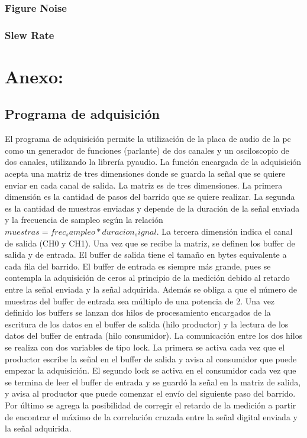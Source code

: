 \documentclass[a4paper, 11pt]{article}
\begin{document}
\subsubsection*{Figure Noise}

\subsubsection*{Slew Rate}

\section*{Anexo:}
\subsection*{Programa de adquisición}
El programa de adquisición permite la utilización de la placa de audio de la pc como un generador de funciones (parlante) de dos canales y un osciloscopio de dos canales, utilizando la librería pyaudio. La función encargada de la adquisición acepta una matriz de tres dimensiones donde se guarda la señal que se quiere enviar en cada canal de salida. La matriz es de tres dimensiones. La primera dimensión es la cantidad de pasos del barrido que se quiere realizar. La segunda es la cantidad de muestras enviadas y depende de la duración de la señal enviada y la frecuencia de sampleo según la relación $muestras=frec_sampleo*duracion_signal$. La tercera dimensión indica el canal de salida (CH0 y CH1).
Una vez que se recibe la matriz, se definen los buffer de salida y de entrada. El buffer de salida tiene el tamaño en bytes equivalente a cada fila del barrido. El buffer de entrada es siempre más grande, pues se contempla la adquisición de ceros al principio de la medición debido al retardo entre la señal enviada y la señal adquirida. Además se obliga a que el número de muestras del buffer de entrada sea múltiplo de una potencia de 2.
Una vez definido los buffers se lanzan dos hilos de procesamiento encargados de la escritura de los datos en el buffer de salida (hilo productor) y la lectura de los datos del buffer de entrada (hilo consumidor). La comunicación entre los dos hilos se realiza con dos variables de tipo lock. La primera se activa cada vez que el productor escribe la señal en el buffer de salida y avisa al consumidor que puede empezar la adquisición. El segundo lock se activa en el consumidor cada vez que se termina de leer el buffer de entrada y se guardó la señal en la matriz de salida, y avisa al productor que puede comenzar el envío del siguiente paso del barrido.
Por último se agrega la posibilidad de corregir el retardo de la medición a partir de encontrar el máximo de la correlación cruzada entre la señal digital enviada y la señal adquirida.
\end{document}
